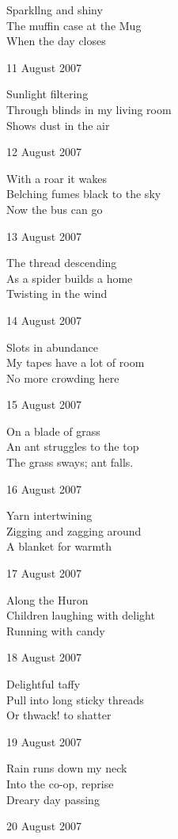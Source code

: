 \documentclass[12pt]{article}
\begin{document}
Sparkllng and shiny \\
The muffin case at the Mug \\
When the day closes

\newpage

11 August 2007

Sunlight filtering \\
Through blinds in my living room \\
Shows dust in the air


12 August 2007

With a roar it wakes \\
Belching fumes black to the sky \\
Now the bus can go

13 August 2007

The thread descending \\
As a spider builds a home \\
Twisting in the wind

14 August 2007

Slots in abundance \\
My tapes have a lot of room \\
No more crowding here

15 August 2007

On a blade of grass \\
An ant struggles to the top \\
The grass sways; ant falls.

16 August 2007

Yarn intertwining \\
Zigging and zagging around \\
A blanket for warmth

17 August 2007

Along the Huron \\
Children laughing with delight \\
Running with candy

\newpage

18 August 2007

Delightful taffy \\
Pull into long sticky threads \\
Or thwack! to shatter

19 August 2007

Rain runs down my neck \\
Into the co-op, reprise \\
Dreary day passing

20 August 2007
\end{document}
